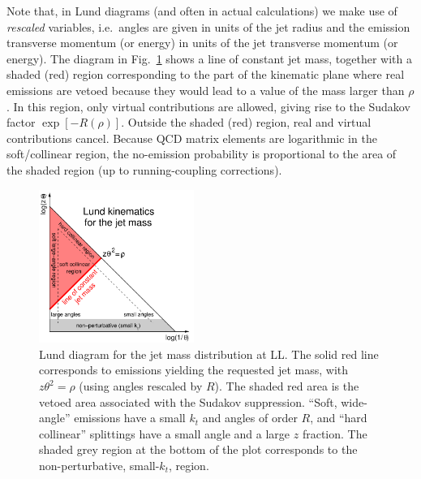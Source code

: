 Note that, in Lund diagrams (and often in actual calculations) we make use of \emph{rescaled} variables, i.e.\ angles are given in units of the jet radius and the emission transverse momentum (or energy) in units of the jet transverse momentum (or energy).
%    
The diagram in Fig.~\ref{fig:lund-plain} shows a line of constant jet
mass, together with a shaded (red) region corresponding to the part of
the kinematic plane where real emissions are vetoed because they would lead
to a value of the mass larger than $\rho$.
%
In this region, only virtual contributions are allowed, giving rise to
the Sudakov factor $\exp[-R(\rho)]$.
%
Outside the shaded (red) region, real and virtual contributions cancel.
% 
Because QCD matrix elements are logarithmic in the soft/collinear
region, the no-emission probability is proportional to the area of the
shaded region (up to running-coupling corrections).
    
\begin{figure}
    \centering
 \includegraphics[width=0.45\textwidth]{figures/Lund-plain.pdf}%
 \caption{Lund diagram for the jet mass distribution at LL. The solid
   red line corresponds to emissions yielding the requested jet mass,
   \ie with $z\theta^2=\rho$ (using angles rescaled by $R$). The
   shaded red area is the vetoed area associated with the Sudakov
   suppression. ``Soft, wide-angle'' emissions have a small $k_t$ and
   angles of order $R$, and ``hard collinear'' splittings have a small
   angle and a large $z$ fraction. The shaded grey region at the
   bottom of the plot corresponds to the non-perturbative,
   small-$k_t$, region.}\label{fig:lund-plain}
\end{figure}

